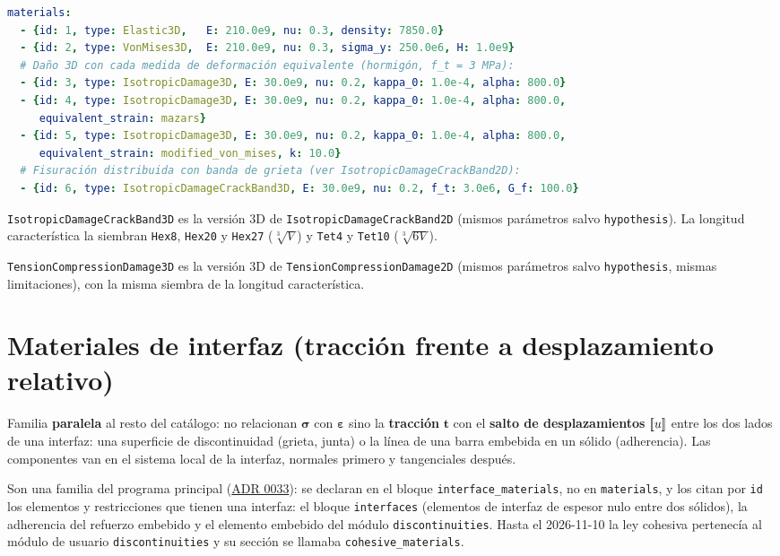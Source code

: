 \documentclass[11pt,oneside]{report}
\providecommand{\llbracket}{\mathopen{[\mkern-3.2mu[}}
\providecommand{\rrbracket}{\mathclose{]\mkern-3.2mu]}}
\begin{document}
\begin{lstlisting}[language=yaml]
materials:
  - {id: 1, type: Elastic3D,   E: 210.0e9, nu: 0.3, density: 7850.0}
  - {id: 2, type: VonMises3D,  E: 210.0e9, nu: 0.3, sigma_y: 250.0e6, H: 1.0e9}
  # Daño 3D con cada medida de deformación equivalente (hormigón, f_t = 3 MPa):
  - {id: 3, type: IsotropicDamage3D, E: 30.0e9, nu: 0.2, kappa_0: 1.0e-4, alpha: 800.0}
  - {id: 4, type: IsotropicDamage3D, E: 30.0e9, nu: 0.2, kappa_0: 1.0e-4, alpha: 800.0,
     equivalent_strain: mazars}
  - {id: 5, type: IsotropicDamage3D, E: 30.0e9, nu: 0.2, kappa_0: 1.0e-4, alpha: 800.0,
     equivalent_strain: modified_von_mises, k: 10.0}
  # Fisuración distribuida con banda de grieta (ver IsotropicDamageCrackBand2D):
  - {id: 6, type: IsotropicDamageCrackBand3D, E: 30.0e9, nu: 0.2, f_t: 3.0e6, G_f: 100.0}

\end{lstlisting}

\texttt{IsotropicDamageCrackBand3D} es la versión 3D de \texttt{IsotropicDamageCrackBand2D} (mismos parámetros salvo \texttt{hypothesis}). La longitud característica la siembran \texttt{Hex8}, \texttt{Hex20} y \texttt{Hex27} ($\sqrt[3]{V}$) y \texttt{Tet4} y \texttt{Tet10} ($\sqrt[3]{6V}$).

\texttt{TensionCompressionDamage3D} es la versión 3D de \texttt{TensionCompressionDamage2D} (mismos parámetros salvo \texttt{hypothesis}, mismas limitaciones), con la misma siembra de la longitud característica.

\section{Materiales de interfaz (tracción frente a desplazamiento relativo)}

Familia \textbf{paralela} al resto del catálogo: no relacionan $\boldsymbol\sigma$ con $\boldsymbol\varepsilon$ sino la \textbf{tracción} $\mathbf{t}$ con el \textbf{salto de desplazamientos} $\llbracket u \rrbracket$ entre los dos lados de una interfaz: una superficie de discontinuidad (grieta, junta) o la línea de una barra embebida en un sólido (adherencia). Las componentes van en el sistema local de la interfaz, normales primero y tangenciales después.

Son una familia del programa principal (\href{https://github.com/jretamav/solidum-fem/blob/main/docs/adr/0033-materiales-de-interfaz.md}{ADR 0033}): se declaran en el bloque \texttt{interface\_\allowbreak{}materials}, no en \texttt{materials}, y los citan por \texttt{id} los elementos y restricciones que tienen una interfaz: el bloque \texttt{interfaces} (elementos de interfaz de espesor nulo entre dos sólidos), la adherencia del refuerzo embebido y el elemento embebido del módulo \texttt{discontinuities}. Hasta el 2026-11-10 la ley cohesiva pertenecía al módulo de usuario \texttt{discontinuities} y su sección se llamaba \texttt{cohesive\_\allowbreak{}materials}.
\end{document}
